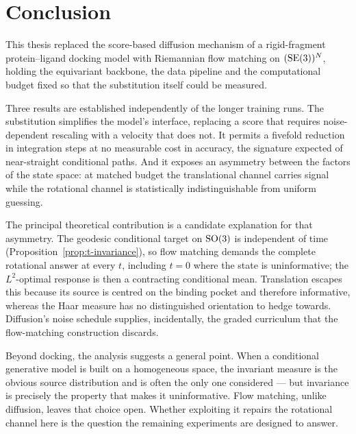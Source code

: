 \chapter{Conclusion}
\label{ch:conclusion}

This thesis replaced the score-based diffusion mechanism of a rigid-fragment
protein--ligand docking model with Riemannian flow matching on
$(\mathrm{SE}(3))^N$, holding the equivariant backbone, the data pipeline and the
computational budget fixed so that the substitution itself could be measured.

Three results are established independently of the longer training runs. The
substitution simplifies the model's interface, replacing a score that requires
noise-dependent rescaling with a velocity that does not. It permits a fivefold
reduction in integration steps at no measurable cost in accuracy, the
signature expected of near-straight conditional paths. And it exposes an
asymmetry between the factors of the state space: at matched budget the
translational channel carries signal while the rotational channel is
statistically indistinguishable from uniform guessing.

The principal theoretical contribution is a candidate explanation for that
asymmetry. The geodesic conditional target on $\mathrm{SO}(3)$ is independent of
time (Proposition~\ref{prop:t-invariance}), so flow matching demands the
complete rotational answer at every $t$, including $t=0$ where the state is
uninformative; the $L^2$-optimal response is then a contracting conditional
mean. Translation escapes this because its source is centred on the binding
pocket and therefore informative, whereas the Haar measure has no distinguished
orientation to hedge towards. Diffusion's noise schedule supplies, incidentally,
the graded curriculum that the flow-matching construction discards.


Beyond docking, the analysis suggests a general point. When a conditional
generative model is built on a homogeneous space, the invariant measure is the
obvious source distribution and is often the only one considered --- but
invariance is precisely the property that makes it uninformative. Flow
matching, unlike diffusion, leaves that choice open. Whether exploiting it
repairs the rotational channel here is the question the remaining experiments
are designed to answer.
